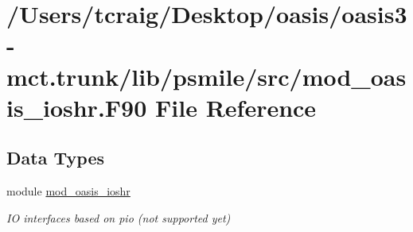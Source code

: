 \hypertarget{mod__oasis__ioshr_8_f90}{\section{/\+Users/tcraig/\+Desktop/oasis/oasis3-\/mct.trunk/lib/psmile/src/mod\+\_\+oasis\+\_\+ioshr.F90 File Reference}
\label{mod__oasis__ioshr_8_f90}
}
\subsection*{Data Types}
\begin{DoxyCompactItemize}
\item 
module \hyperlink{classmod__oasis__ioshr}{mod\+\_\+oasis\+\_\+ioshr}
\begin{DoxyCompactList}\small\item\em I\+O interfaces based on pio (not supported yet) \end{DoxyCompactList}\end{DoxyCompactItemize}
